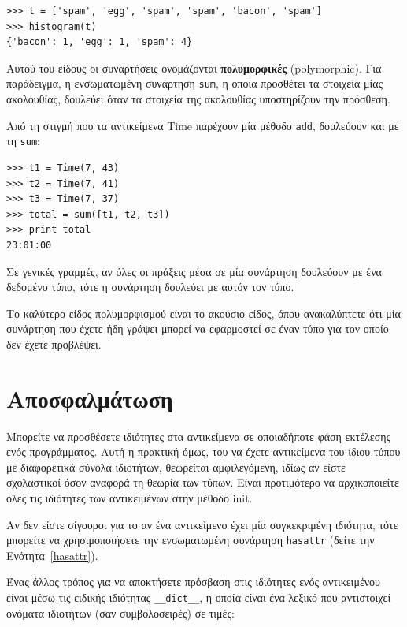 \documentclass[10pt]{book}
\begin{document}
\begin{verbatim}
>>> t = ['spam', 'egg', 'spam', 'spam', 'bacon', 'spam']
>>> histogram(t)
{'bacon': 1, 'egg': 1, 'spam': 4}
\end{verbatim}
%
Αυτού του είδους οι συναρτήσεις ονομάζονται {\bf πολυμορφικές} (polymorphic).
Για παράδειγμα, η ενσωματωμένη συνάρτηση {\tt sum}, η οποία προσθέτει τα στοιχεία μίας ακολουθίας, δουλεύει
όταν τα στοιχεία της ακολουθίας υποστηρίζουν την πρόσθεση.

Από τη στιγμή που τα αντικείμενα Time παρέχουν μία μέθοδο {\tt add},  
δουλεύουν και με τη {\tt sum}:

\begin{verbatim}
>>> t1 = Time(7, 43)
>>> t2 = Time(7, 41)
>>> t3 = Time(7, 37)
>>> total = sum([t1, t2, t3])
>>> print total
23:01:00
\end{verbatim}
%
Σε γενικές γραμμές, αν όλες οι πράξεις μέσα σε μία συνάρτηση δουλεύουν με ένα δεδομένο τύπο, τότε η
συνάρτηση δουλεύει με αυτόν τον τύπο.

Το καλύτερο είδος πολυμορφισμού είναι το ακούσιο είδος, όπου ανακαλύπτετε ότι μία συνάρτηση που έχετε ήδη
γράψει μπορεί να εφαρμοστεί σε έναν τύπο για τον οποίο δεν έχετε προβλέψει.


\section{Αποσφαλμάτωση}

Μπορείτε να προσθέσετε ιδιότητες στα αντικείμενα σε οποιαδήποτε φάση εκτέλεσης ενός
προγράμματος. Αυτή η πρακτική όμως, του να έχετε αντικείμενα του ίδιου τύπου με διαφορετικά σύνολα ιδιοτήτων,
θεωρείται αμφιλεγόμενη, ιδίως αν είστε σχολαστικοί όσον αναφορά τη θεωρία των τύπων. Είναι προτιμότερο να αρχικοποιείτε όλες τις ιδιότητες των αντικειμένων στην μέθοδο init.

 
Αν δεν είστε σίγουροι για το αν ένα αντικείμενο έχει μία συγκεκριμένη ιδιότητα, τότε μπορείτε 
να χρησιμοποιήσετε την ενσωματωμένη συνάρτηση {\tt hasattr} (δείτε την Ενότητα~\ref{hasattr}).

Ένας άλλος τρόπος για να αποκτήσετε πρόσβαση στις ιδιότητες ενός αντικειμένου είναι μέσω τις ειδικής
ιδιότητας \verb"__dict__", η οποία είναι ένα λεξικό που αντιστοιχεί ονόματα ιδιοτήτων (σαν συμβολοσειρές)
σε τιμές:
\end{document}
